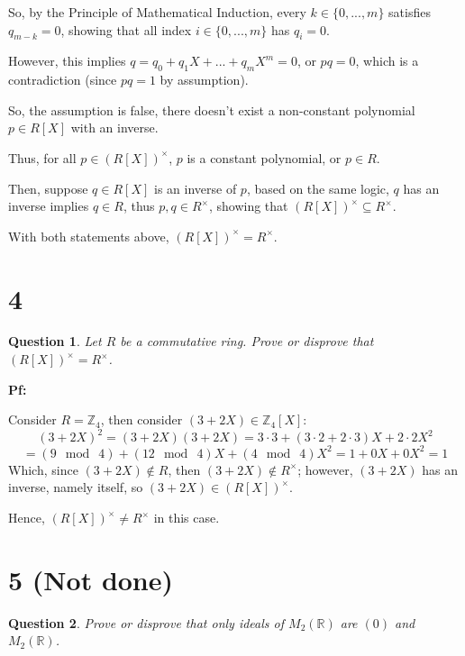 \documentclass{article}
\newtheorem{question}{Question}
\begin{document}
So, by the Principle of Mathematical Induction, every $k\in \{0,...,m\}$ satisfies $q_{m-k}=0$, showing that all index $i\in\{0,...,m\}$ has $q_i=0$.

However, this implies $q = q_0+q_1X+...+q_mX^m = 0$, or $pq = 0$, which is a contradiction (since $pq=1$ by assumption).

So, the assumption is false, there doesn't exist a non-constant polynomial $p\in R[X]$ with an inverse.

Thus, for all $p\in (R[X])^\times$, $p$ is a constant polynomial, or $p\in R$.

Then, suppose $q\in R[X]$ is an inverse of $p$, based on the same logic, $q$ has an inverse implies $q\in R$, thus $p,q\in R^\times$, showing that $(R[X])^\times \subseteq R^\times$.

\hfill

With both statements above, $(R[X])^\times = R^\times$.


\break


\section*{4}
\begin{myBox}[]{}
    \begin{question}
        Let $R$ be a commutative ring. Prove or disprove that $(R[X])^\times = R^\times$.
    \end{question}
\end{myBox}

\textbf{Pf:}

Consider $R=\mathbb{Z}_4$, then consider $(3+2X)\in \mathbb{Z}_4[X]$:
$$(3+2X)^2 = (3+2X)(3+2X) = 3\cdot 3 + (3\cdot 2+2\cdot 3)X + 2\cdot 2X^2$$
$$ = (9\mod\ 4)+(12\mod\ 4)X + (4\mod\ 4)X^2 = 1+0X+0X^2 = 1$$
Which, since $(3+2X)\notin R$, then $(3+2X)\notin R^\times$; however, $(3+2X)$ has an inverse, namely itself,
so $(3+2X)\in (R[X])^\times$.

Hence, $(R[X])^\times \neq R^\times$ in this case.

\break


\section*{5 (Not done)}
\begin{myBox}[]{}
    \begin{question}
        Prove or disprove that only ideals of $M_2(\mathbb{R})$ are $(0)$ and $M_2(\mathbb{R})$.
    \end{question}
\end{myBox}
\end{document}
